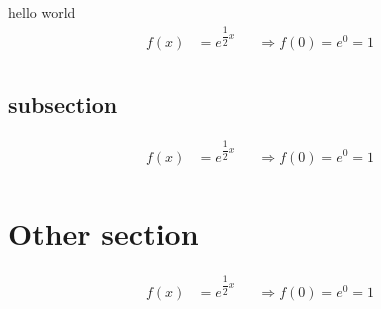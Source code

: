 \documentclass[10pt, a4paper]{article}
\begin{document}
hello world
	{ \small
		\begin{align*}
			f(x) & = e^{\dfrac{1}{2} x} &  & \Rightarrow f(0) = e^0 = 1 \\
		\end{align*}
	}

\subsection{subsection}
{ \small
	\begin{align*}
		f(x) & = e^{\dfrac{1}{2} x} &  & \Rightarrow f(0) = e^0 = 1 \\
	\end{align*}
}

\section{Other section}
 { \small
  \begin{align*}
	  f(x) & = e^{\dfrac{1}{2} x} &  & \Rightarrow f(0) = e^0 = 1 \\
  \end{align*}
 }
\end{document}
